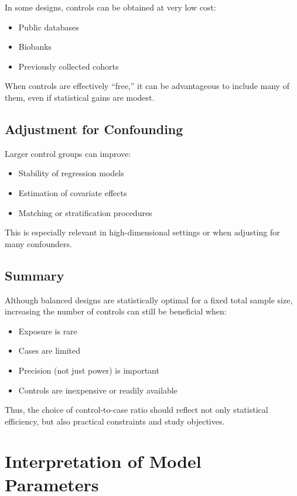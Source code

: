\documentclass[11pt]{article}
\begin{document}
In some designs, controls can be obtained at very low cost:
\begin{itemize}
    \item Public databases
    \item Biobanks
    \item Previously collected cohorts
\end{itemize}

When controls are effectively ``free,'' it can be advantageous to include many of them, even if statistical gains are modest.

\subsection{Adjustment for Confounding}

Larger control groups can improve:
\begin{itemize}
    \item Stability of regression models
    \item Estimation of covariate effects
    \item Matching or stratification procedures
\end{itemize}

This is especially relevant in high-dimensional settings or when adjusting for many confounders.

\subsection{Summary}

Although balanced designs are statistically optimal for a fixed total sample size, increasing the number of controls can still be beneficial when:
\begin{itemize}
    \item Exposure is rare
    \item Cases are limited
    \item Precision (not just power) is important
    \item Controls are inexpensive or readily available
\end{itemize}

Thus, the choice of control-to-case ratio should reflect not only statistical efficiency, but also practical constraints and study objectives.

\appendix
\section{Interpretation of Model Parameters}
\end{document}
